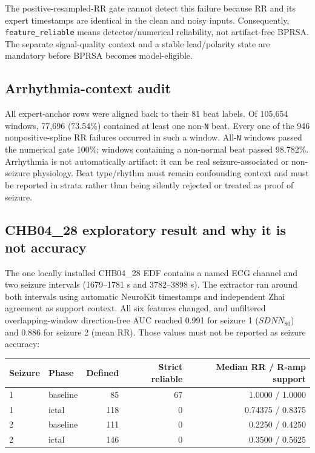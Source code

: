\documentclass[11pt,a4paper]{article}
\begin{document}
The positive-resampled-RR gate cannot detect this failure because RR and its
expert timestamps are identical in the clean and noisy inputs. Consequently,
\texttt{feature\_reliable} means detector/numerical reliability, not
artifact-free BPRSA. The separate signal-quality context and a stable
lead/polarity state are mandatory before BPRSA becomes model-eligible.

\subsection{Arrhythmia-context audit}

All expert-anchor rows were aligned back to their 81 beat labels. Of 105,654
windows, 77,696 (73.54\%) contained at least one non-\texttt{N} beat. Every
one of the 946 nonpositive-spline RR failures occurred in such a window.
All-\texttt{N} windows passed the numerical gate 100\%; windows containing a
non-normal beat passed 98.782\%. Arrhythmia is not automatically artifact:
it can be real seizure-associated or non-seizure physiology. Beat type/rhythm
must remain confounding context and must be reported in strata rather than
being silently rejected or treated as proof of seizure.

\subsection{CHB04\_28 exploratory result and why it is not accuracy}

The one locally installed CHB04\_28 EDF contains a named ECG channel and two
seizure intervals (1679--1781 s and 3782--3898 s). The extractor ran around
both intervals using automatic NeuroKit timestamps and independent Zhai
agreement as support context. All six features changed, and unfiltered
overlapping-window direction-free AUC reached 0.991 for seizure 1
($SDNN_{80}$) and 0.886 for seizure 2 (mean RR). Those values must not be
reported as seizure accuracy:

\begin{center}
\begin{tabular}{llrrr}
\toprule
Seizure & Phase & Defined & Strict reliable & Median RR / R-amp support \\
\midrule
1 & baseline & 85 & 67 & 1.0000 / 1.0000 \\
1 & ictal & 118 & 0 & 0.74375 / 0.8375 \\
2 & baseline & 111 & 0 & 0.2250 / 0.4250 \\
2 & ictal & 146 & 0 & 0.3500 / 0.5625 \\
\bottomrule
\end{tabular}
\end{center}
\end{document}
